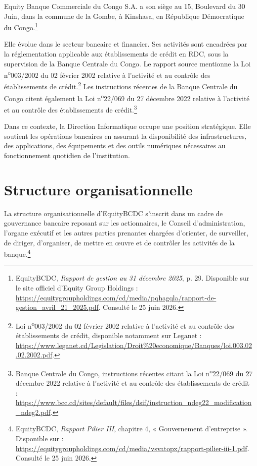 \documentclass[12pt,a4paper]{report}
\begin{document}
Equity Banque Commerciale du Congo S.A. a son siège au 15, Boulevard du 30 Juin, dans la commune de la Gombe, à Kinshasa, en République Démocratique du Congo.\footnote{EquityBCDC, \textit{Rapport de gestion au 31 décembre 2025},
p. 29. Disponible sur le site officiel d'Equity Group Holdings :
\url{https://equitygroupholdings.com/cd/media/pqhagqla/rapport-de-gestion_avril_21_2025.pdf}.
Consulté le 25 juin 2026.}

Elle évolue dans le secteur bancaire et financier. Ses activités sont encadrées par la réglementation applicable aux établissements de crédit en RDC, sous la supervision de la Banque Centrale du Congo. Le rapport source mentionne la Loi n\textsuperscript{o}003/2002 du 02 février 2002 relative à l'activité et au contrôle des établissements de crédit.\footnote{Loi n\textsuperscript{o}003/2002 du 02 février 2002 relative à l'activité et au contrôle des établissements de crédit, disponible notamment sur Leganet : \url{https://www.leganet.cd/Legislation/Droit\%20economique/Banques/loi.003.02.02.2002.pdf}.} Les instructions récentes de la Banque Centrale du Congo citent également la Loi n\textsuperscript{o}22/069 du 27 décembre 2022 relative à l'activité et au contrôle des établissements de crédit.\footnote{Banque Centrale du Congo, instructions récentes citant la Loi n\textsuperscript{o}22/069 du 27 décembre 2022 relative à l'activité et au contrôle des établissements de crédit : \url{https://www.bcc.cd/sites/default/files/dsif/instruction_ndeg22_modification_ndeg2.pdf}.}

Dans ce contexte, la Direction Informatique occupe une position stratégique. Elle soutient les opérations bancaires en assurant la disponibilité des infrastructures, des applications, des équipements et des outils numériques nécessaires au fonctionnement quotidien de l'institution.

\section{Structure organisationnelle}

La structure organisationnelle d'EquityBCDC s'inscrit dans un cadre de gouvernance bancaire reposant sur les actionnaires, le Conseil d'administration, l'organe exécutif et les autres parties prenantes chargées d'orienter, de surveiller, de diriger, d'organiser, de mettre en œuvre et de
contrôler les activités de la banque.\footnote{EquityBCDC, \textit{Rapport Pilier III},
chapitre 4, « Gouvernement d'entreprise ». Disponible sur :
\url{https://equitygroupholdings.com/cd/media/vsvatopx/rapport-pilier-iii-1.pdf}. Consulté le 25 juin 2026.}
\end{document}
